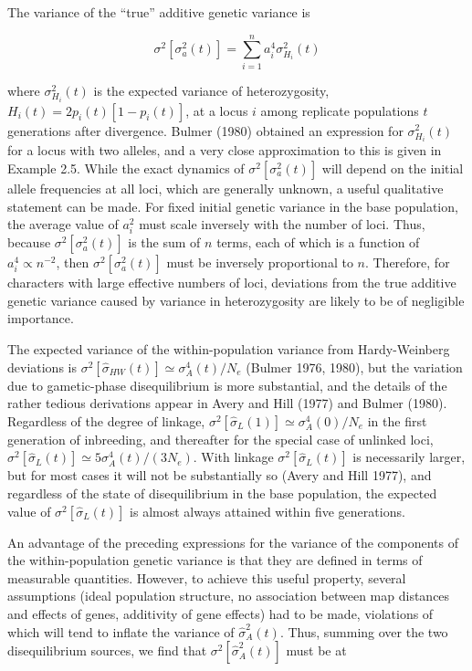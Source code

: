 \documentclass{article}
\begin{document}
The variance of the “true” additive genetic variance is

\begin{equation}
\sigma^{2}\left[\sigma_{a}^{2}(t)\right]=\sum_{i=1}^{n}a_{i}^{4}\sigma_{H_{i}}^{2}(t)
\tag{11.12}
\label{eq:11_12}
\end{equation}

where  $ \sigma_{H_i}^2(t) $ is the expected variance of heterozygosity,  $ H_i(t) = 2p_i(t)[1 - p_i(t)] $, at a locus  $ i $ among replicate populations  $ t $ generations after divergence. Bulmer (1980) obtained an expression for  $ \sigma_{H_i}^2(t) $ for a locus with two alleles, and a very close approximation to this is given in Example 2.5. While the exact dynamics of  $ \sigma^2[\sigma_a^2(t)] $ will depend on the initial allele frequencies at all loci, which are generally unknown, a useful qualitative statement can be made. For fixed initial genetic variance in the base population, the average value of  $ a_i^2 $ must scale inversely with the number of loci. Thus, because  $ \sigma^2[\sigma_a^2(t)] $ is the sum of  $ n $ terms, each of which is a function of  $ a_i^4 \propto n^{-2} $, then  $ \sigma^2[\sigma_a^2(t)] $ must be inversely proportional to  $ n $. Therefore, for characters with large effective numbers of loci, deviations from the true additive genetic variance caused by variance in heterozygosity are likely to be of negligible importance.

The expected variance of the within-population variance from Hardy-Weinberg deviations is  $ \sigma^2[\widehat{\sigma}_{HW}(t)] \simeq \sigma_A^4(t)/N_e $ (Bulmer 1976, 1980), but the variation due to gametic-phase disequilibrium is more substantial, and the details of the rather tedious derivations appear in Avery and Hill (1977) and Bulmer (1980). Regardless of the degree of linkage,  $ \sigma^2[\widehat{\sigma}_L(1)] \simeq \sigma_A^4(0)/N_e $ in the first generation of inbreeding, and thereafter for the special case of unlinked loci,  $ \sigma^2[\widehat{\sigma}_L(t)] \simeq 5\sigma_A^4(t)/(3N_e) $. With linkage  $ \sigma^2[\widehat{\sigma}_L(t)] $ is necessarily larger, but for most cases it will not be substantially so (Avery and Hill 1977), and regardless of the state of disequilibrium in the base population, the expected value of  $ \sigma^2[\widehat{\sigma}_L(t)] $ is almost always attained within five generations.

An advantage of the preceding expressions for the variance of the components of the within-population genetic variance is that they are defined in terms of measurable quantities. However, to achieve this useful property, several assumptions (ideal population structure, no association between map distances and effects of genes, additivity of gene effects) had to be made, violations of which will tend to inflate the variance of  $ \widehat{\sigma}_{A}^{2}(t) $. Thus, summing over the two disequilibrium sources, we find that  $ \sigma^{2}[\widehat{\sigma}_{A}^{2}(t)] $ must be at
\end{document}
